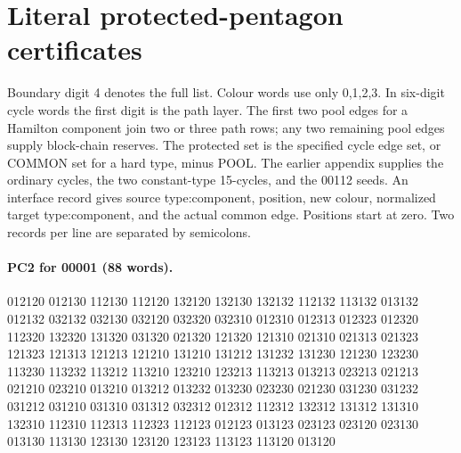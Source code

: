 \documentclass[11pt]{article}
\theoremstyle{remark}
\numberwithin{equation}{section}
\numberwithin{table}{section}
\begin{document}
\section{Literal protected-pentagon certificates}
\label{app:protected-pentagon-words}
Boundary digit 4 denotes the full list. Colour words use only 0,1,2,3.
In six-digit cycle words the first digit is the path layer.
The first two pool edges for a Hamilton component join two or three
path rows; any two remaining pool edges supply block-chain reserves.
The protected set is the specified cycle edge set, or COMMON set
for a hard type, minus POOL. The earlier appendix supplies the
ordinary cycles, the two constant-type 15-cycles, and the 00112 seeds.
An interface record gives source type:component, position, new colour,
normalized target type:component, and the actual common edge.
Positions start at zero. Two records per line are separated by semicolons.
\paragraph{PC2 for 00001 (88 words).}
\begingroup\footnotesize\ttfamily\begin{flushleft}
012120 012130 112130 112120 132120 132130 132132 112132 113132 013132\\
012132 032132 032130 032120 032320 032310 012310 012313 012323 012320\\
112320 132320 131320 031320 021320 121320 121310 021310 021313 021323\\
121323 121313 121213 121210 131210 131212 131232 131230 121230 123230\\
113230 113232 113212 113210 123210 123213 113213 013213 023213 021213\\
021210 023210 013210 013212 013232 013230 023230 021230 031230 031232\\
031212 031210 031310 031312 032312 012312 112312 132312 131312 131310\\
132310 112310 112313 112323 112123 012123 013123 023123 023120 023130\\
013130 113130 123130 123120 123123 113123 113120 013120\\
\end{flushleft}\endgroup
\end{document}

